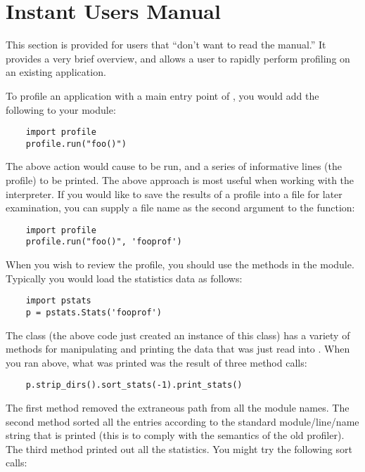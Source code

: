 \section{Instant Users Manual}

This section is provided for users that ``don't want to read the
manual.'' It provides a very brief overview, and allows a user to
rapidly perform profiling on an existing application.

To profile an application with a main entry point of , you
would add the following to your module:

\begin{verbatim}
    import profile
    profile.run("foo()")
\end{verbatim}

The above action would cause  to be run, and a series of
informative lines (the profile) to be printed.  The above approach is
most useful when working with the interpreter.  If you would like to
save the results of a profile into a file for later examination, you
can supply a file name as the second argument to the 
function:

\begin{verbatim}
    import profile
    profile.run("foo()", 'fooprof')
\end{verbatim}

When you wish to review the profile, you should use the methods in the
 module.  Typically you would load the statistics data as
follows:

\begin{verbatim}
    import pstats
    p = pstats.Stats('fooprof')
\end{verbatim}

The class  (the above code just created an instance of
this class) has a variety of methods for manipulating and printing the
data that was just read into .  When you ran
 above, what was printed was the result of three
method calls:

\begin{verbatim}
    p.strip_dirs().sort_stats(-1).print_stats()
\end{verbatim}

The first method removed the extraneous path from all the module
names. The second method sorted all the entries according to the
standard module/line/name string that is printed (this is to comply
with the semantics of the old profiler).  The third method printed out
all the statistics.  You might try the following sort calls:


